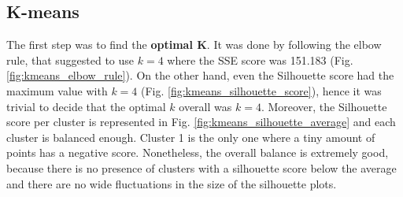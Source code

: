 \subsection{K-means}
\label{sec:k-means}

The first step was to find the \textbf{optimal K}. It was done by following the elbow rule, that suggested to use $k=4$ where the SSE score was 151.183 (Fig. \ref{fig:kmeans_elbow_rule}). On the other hand, even the Silhouette score had the maximum value with $k=4$ (Fig. \ref{fig:kmeans_silhouette_score}), hence it was trivial to decide that the optimal $k$ overall was $k=4$. Moreover, the Silhouette score per cluster is represented in Fig. \ref{fig:kmeans_silhouette_average} and each cluster is balanced enough. Cluster 1 is the only one where a tiny amount of points has a negative score. Nonetheless, the overall balance is extremely good, because there is no presence of clusters with a silhouette score below the average and there are no wide fluctuations in the size of the silhouette plots.

